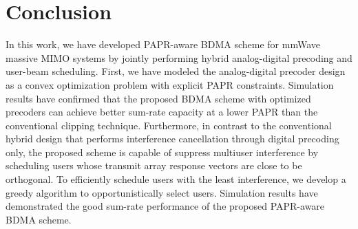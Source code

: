 \documentclass[conference]{IEEEtran}
\begin{document}
\section{Conclusion}
In this work, we have developed PAPR-aware BDMA scheme for mmWave massive MIMO systems by jointly performing hybrid analog-digital precoding and user-beam scheduling. First, we have modeled the analog-digital precoder design as a convex optimization problem with explicit PAPR constraints. Simulation results have confirmed that the proposed BDMA scheme with optimized precoders can achieve better sum-rate capacity at a lower PAPR than the conventional clipping technique. Furthermore, in contrast to the conventional hybrid design that performs interference cancellation through digital precoding only, the proposed scheme is capable of suppress multiuser interference by scheduling users whose transmit array response vectors are close to be orthogonal. To efficiently schedule users with the least interference, we develop a greedy algorithm to opportunistically select users. Simulation results have demonstrated the good sum-rate performance of the proposed PAPR-aware BDMA scheme.
%
%

\end{document}
